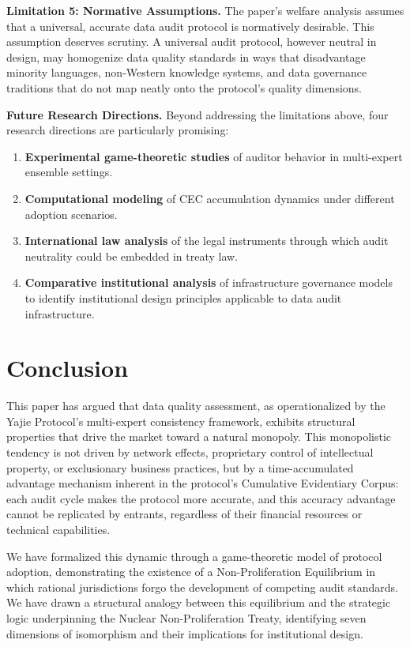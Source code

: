 \documentclass[12pt,a4paper]{ctexart}
\theoremstyle{definition}
\theoremstyle{remark}
\begin{document}
\textbf{Limitation 5: Normative Assumptions.} The paper's welfare analysis assumes that a universal, accurate data audit protocol is normatively desirable. This assumption deserves scrutiny. A universal audit protocol, however neutral in design, may homogenize data quality standards in ways that disadvantage minority languages, non-Western knowledge systems, and data governance traditions that do not map neatly onto the protocol's quality dimensions.

\textbf{Future Research Directions.} Beyond addressing the limitations above, four research directions are particularly promising:
\begin{enumerate}
\item \textbf{Experimental game-theoretic studies} of auditor behavior in multi-expert ensemble settings.
\item \textbf{Computational modeling} of CEC accumulation dynamics under different adoption scenarios.
\item \textbf{International law analysis} of the legal instruments through which audit neutrality could be embedded in treaty law.
\item \textbf{Comparative institutional analysis} of infrastructure governance models to identify institutional design principles applicable to data audit infrastructure.
\end{enumerate}

\section{Conclusion}

This paper has argued that data quality assessment, as operationalized by the Yajie Protocol's multi-expert consistency framework, exhibits structural properties that drive the market toward a natural monopoly. This monopolistic tendency is not driven by network effects, proprietary control of intellectual property, or exclusionary business practices, but by a time-accumulated advantage mechanism inherent in the protocol's Cumulative Evidentiary Corpus: each audit cycle makes the protocol more accurate, and this accuracy advantage cannot be replicated by entrants, regardless of their financial resources or technical capabilities.

We have formalized this dynamic through a game-theoretic model of protocol adoption, demonstrating the existence of a Non-Proliferation Equilibrium in which rational jurisdictions forgo the development of competing audit standards. We have drawn a structural analogy between this equilibrium and the strategic logic underpinning the Nuclear Non-Proliferation Treaty, identifying seven dimensions of isomorphism and their implications for institutional design.
\end{document}
